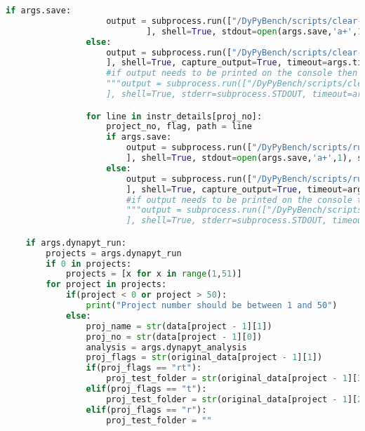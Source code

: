 \begin{lstlisting}[caption=Access Interface of DyPyBench,label=code:dypybench.py,language=Python]
                if args.save:
                    output = subprocess.run(["/DyPyBench/scripts/clear-project.sh %s %s" %(proj_name, proj_no)
                            ], shell=True, stdout=open(args.save,'a+',1), stderr=subprocess.STDOUT, timeout=args.timeout)
                else:
                    output = subprocess.run(["/DyPyBench/scripts/clear-project.sh %s %s" %(proj_name, proj_no)
                    ], shell=True, capture_output=True, timeout=args.timeout)
                    #if output needs to be printed on the console then comment above and uncomment below
                    """output = subprocess.run(["/DyPyBench/scripts/clear-project.sh %s %s" %(proj_name, proj_no)
                    ], shell=True, stderr=subprocess.STDOUT, timeout=args.timeout)"""

                for line in instr_details[proj_no]:
                    project_no, flag, path = line
                    if args.save:
                        output = subprocess.run(["/DyPyBench/scripts/run-dynapyt-instrumentation.sh %s %s %s %s %s %s" %(proj_name, proj_no, path, analysis, flag, args.timeout)
                        ], shell=True, stdout=open(args.save,'a+',1), stderr=subprocess.STDOUT, timeout=args.timeout)
                    else:
                        output = subprocess.run(["/DyPyBench/scripts/run-dynapyt-instrumentation.sh %s %s %s %s %s %s" %(proj_name, proj_no, path, analysis, flag, args.timeout)
                        ], shell=True, capture_output=True, timeout=args.timeout)
                        #if output needs to be printed on the console then comment above and uncomment below
                        """output = subprocess.run(["/DyPyBench/scripts/run-dynapyt-instrumentation.sh %s %s %s %s %s %s" %(proj_name, proj_no, path, analysis, flag, args.timeout)
                        ], shell=True, stderr=subprocess.STDOUT, timeout=args.timeout)"""

    if args.dynapyt_run:
        projects = args.dynapyt_run
        if 0 in projects:
            projects = [x for x in range(1,51)]
        for project in projects:
            if(project < 0 or project > 50):
                print("Project number should be between 1 and 50")
            else:
                proj_name = str(data[project - 1][1])
                proj_no = str(data[project - 1][0])
                analysis = args.dynapyt_analysis
                proj_flags = str(original_data[project - 1][1])
                if(proj_flags == "rt"):
                    proj_test_folder = str(original_data[project - 1][3])
                elif(proj_flags == "t"):
                    proj_test_folder = str(original_data[project - 1][2])
                elif(proj_flags == "r"):
                    proj_test_folder = ""


\end{lstlisting}
